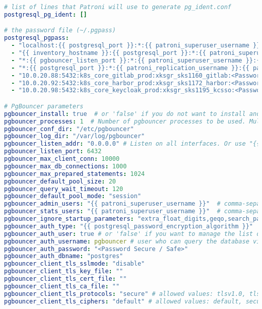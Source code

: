 \begin{flushleft}
\begin{lstlisting}[language=yaml, caption=Testsystem - Anhang - Maintenance - main.yml,captionpos=b,label={lst:testsystem-maintenance-main.yml},breaklines=true]
# list of lines that Patroni will use to generate pg_ident.conf
postgresql_pg_ident: []

# the password file (~/.pgpass)
postgresql_pgpass:
  - "localhost:{{ postgresql_port }}:*:{{ patroni_superuser_username }}:{{ patroni_superuser_password }}"
  - "{{ inventory_hostname }}:{{ postgresql_port }}:*:{{ patroni_superuser_username }}:{{ patroni_superuser_password }}"
  - "*:{{ pgbouncer_listen_port }}:*:{{ patroni_superuser_username }}:{{ patroni_superuser_password }}"
  - "*:{{ postgresql_port }}:*:{{ patroni_replication_username }}:{{ patroni_replication_password }}"
  - "10.0.20.88:5432:k8s_core_gitlab_prod:xksgr_sks1160_gitlab:<Password Secure / Safe>"
  - "10.0.20.92:5432:k8s_core_harbor_prod:xksgr_sks1172_harbor:<Password Secure / Safe>"
  - "10.0.20.98:5432:k8s_core_keycloak_prod:xksgr_sks1195_kcsso:<Password Secure / Safe>"

# PgBouncer parameters
pgbouncer_install: true  # or 'false' if you do not want to install and configure the pgbouncer service
pgbouncer_processes: 1  # Number of pgbouncer processes to be used. Multiple processes use the so_reuseport option for better performance.
pgbouncer_conf_dir: "/etc/pgbouncer"
pgbouncer_log_dir: "/var/log/pgbouncer"
pgbouncer_listen_addr: "0.0.0.0" # Listen on all interfaces. Or use "{{ inventory_hostname }}" to listen on a specific IP address.
pgbouncer_listen_port: 6432
pgbouncer_max_client_conn: 10000
pgbouncer_max_db_connections: 1000
pgbouncer_max_prepared_statements: 1024
pgbouncer_default_pool_size: 20
pgbouncer_query_wait_timeout: 120
pgbouncer_default_pool_mode: "session"
pgbouncer_admin_users: "{{ patroni_superuser_username }}"  # comma-separated list of users, who are allowed to change settings
pgbouncer_stats_users: "{{ patroni_superuser_username }}"  # comma-separated list of users who are just allowed to use SHOW command
pgbouncer_ignore_startup_parameters: "extra_float_digits,geqo,search_path"
pgbouncer_auth_type: "{{ postgresql_password_encryption_algorithm }}"
pgbouncer_auth_user: true # or 'false' if you want to manage the list of users for authentication in the database via userlist.txt
pgbouncer_auth_username: pgbouncer # user who can query the database via the user_search function
pgbouncer_auth_password: "<Password Secure / Safe>"
pgbouncer_auth_dbname: "postgres"
pgbouncer_client_tls_sslmode: "disable"
pgbouncer_client_tls_key_file: ""
pgbouncer_client_tls_cert_file: ""
pgbouncer_client_tls_ca_file: ""
pgbouncer_client_tls_protocols: "secure" # allowed values: tlsv1.0, tlsv1.1, tlsv1.2, tlsv1.3, all, secure (tlsv1.2,tlsv1.3)
pgbouncer_client_tls_ciphers: "default" # allowed values: default, secure, fast, normal, all (not recommended)


\end{lstlisting}
\end{flushleft}
